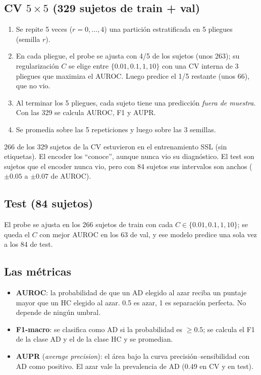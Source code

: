 \documentclass[11pt,a4paper]{article}
\begin{document}
\subsection{\texorpdfstring{CV $5\times5$}{CV 5x5} (329 sujetos de train + val)}

\begin{enumerate}
\item Se repite 5 veces ($r=0,\ldots,4$) una partición estratificada en 5 pliegues (semilla $r$).
\item En cada pliegue, el probe se ajusta con 4/5 de los sujetos (unos 263); su regularización $C$
  se elige entre $\{0.01, 0.1, 1, 10\}$ con una CV interna de 3 pliegues que maximiza el AUROC. Luego
  predice el 1/5 restante (unos 66), que no vio.
\item Al terminar los 5 pliegues, cada sujeto tiene una predicción \emph{fuera de muestra}. Con las
  329 se calcula AUROC, F1 y AUPR.
\item Se promedia sobre las 5 repeticiones y luego sobre las 3 semillas.
\end{enumerate}

\begin{warnbox}
266 de los 329 sujetos de la CV estuvieron en el entrenamiento SSL (sin etiquetas). El encoder los
``conoce'', aunque nunca vio su diagnóstico. El test son sujetos que el encoder nunca vio, pero con
84 sujetos sus intervalos son anchos ($\pm0.05$ a $\pm0.07$ de AUROC).
\end{warnbox}

\subsection{Test (84 sujetos)}

El probe se ajusta en los 266 sujetos de train con cada $C\in\{0.01,0.1,1,10\}$; se queda el $C$ con
mejor AUROC en los 63 de val, y ese modelo predice una sola vez a los 84 de test.

\subsection{Las métricas}

\begin{itemize}
\item \textbf{AUROC}: la probabilidad de que un AD elegido al azar reciba un puntaje mayor que un HC
  elegido al azar. 0.5 es azar, 1 es separación perfecta. No depende de ningún umbral.
\item \textbf{F1-macro}: se clasifica como AD si la probabilidad es $\geq0.5$; se calcula el F1 de la
  clase AD y el de la clase HC y se promedian.
\item \textbf{AUPR} (\emph{average precision}): el área bajo la curva precisión--sensibilidad con AD
  como positivo. El azar vale la prevalencia de AD (0.49 en CV y en test).
\end{itemize}
\end{document}
